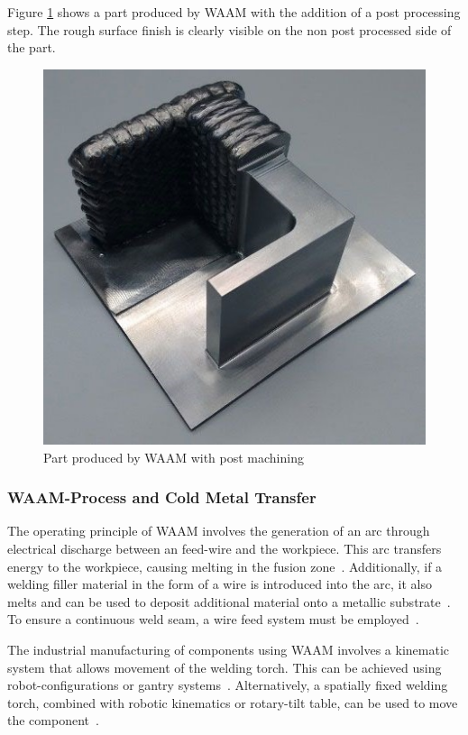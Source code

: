 Figure \ref{WAAMba} shows a part produced by WAAM with the addition of a post processing step. The rough surface finish is clearly visible on the non post processed side of the part.

\begin{figure}[H]
	\centerline{\includegraphics[scale=.6]{figures/WAAMba.jpg}}
	\caption{Part produced by WAAM with post machining~\cite{WAAMba}}
	\label{WAAMba}
\end{figure}

\subsubsection{WAAM-Process and Cold Metal Transfer}\label{CMT}
The operating principle of WAAM involves the generation of an arc through electrical discharge between an feed-wire and the workpiece. This arc transfers energy to the workpiece, causing melting in the fusion zone~\cite{Ou.2018}. Additionally, if a welding filler material in the form of a wire is introduced into the arc, it also melts and can be used to deposit additional material onto a metallic substrate~\cite{Cunningham.2018}. To ensure a continuous weld seam, a wire feed system must be employed~\cite{Ding.2015}.

The industrial manufacturing of components using WAAM involves a kinematic system that allows movement of the welding torch. This can be achieved using robot-configurations or gantry systems~\cite{Schmitz.2021}. Alternatively, a spatially fixed welding torch, combined with robotic kinematics or rotary-tilt table, can be used to move the component~\cite{Nagasai.2022}. %

